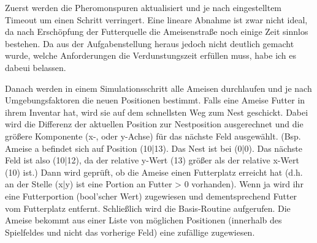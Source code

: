 \documentclass[a4paper,12pt]{scrartcl}
\begin{document}
Zuerst werden die Pheromonspuren aktualisiert und je nach eingestelltem Timeout um einen Schritt verringert. Eine lineare Abnahme ist zwar nicht ideal, da nach Erschöpfung der Futterquelle die Ameisenstraße noch einige Zeit \glqq{}sinnlos\grqq{} bestehen. Da aus der Aufgabenstellung heraus jedoch nicht deutlich gemacht wurde, welche Anforderungen die Verdunstungszeit erfüllen muss, habe ich es dabeui belassen.

Danach werden in einem Simulationsschritt alle Ameisen durchlaufen und je nach \glqq{}Umgebungsfaktoren\grqq{} die neuen Positionen bestimmt. Falls eine Ameise Futter in ihrem Inventar hat, wird sie auf dem schnellsten Weg zum Nest geschickt. Dabei wird die Differenz der aktuellen Position zur Nestposition ausgerechnet und die größere Komponente (x-, oder y-Achse) für das nächste Feld ausgewählt. (Bsp. Ameise a befindet sich auf Position (10|13). Das Nest ist bei (0|0). Das nächste Feld ist also (10|12), da der relative y-Wert (13) größer als der relative x-Wert (10) ist.)
Dann wird geprüft, ob die Ameise einen Futterplatz erreicht hat (d.h. an der Stelle (x|y) ist eine Portion an Futter > 0 vorhanden). Wenn ja wird ihr eine Futterportion (bool'scher Wert) zugewiesen und dementsprechend Futter vom Futterplatz entfernt.
Schließlich wird die Basis-Routine aufgerufen. Die Ameise bekommt aus einer Liste von möglichen Positionen (innerhalb des Spielfeldes und nicht das vorherige Feld) eine zufällige zugewiesen.
\end{document}

